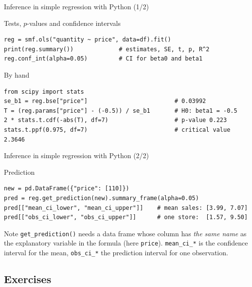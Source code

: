 \documentclass[aspectratio=169,11pt]{beamer}
\begin{document}
\begin{frame}[fragile]{Inference in simple regression with Python (1/2)}
  \begin{block}{Tests, $p$-values and confidence intervals}
\begin{lstlisting}
reg = smf.ols("quantity ~ price", data=df).fit()
print(reg.summary())             # estimates, SE, t, p, R^2
reg.conf_int(alpha=0.05)         # CI for beta0 and beta1
\end{lstlisting}
  \end{block}
  \begin{block}{By hand}
\begin{lstlisting}
from scipy import stats
se_b1 = reg.bse["price"]                         # 0.03992
T = (reg.params["price"] - (-0.5)) / se_b1       # H0: beta1 = -0.5
2 * stats.t.cdf(-abs(T), df=7)                   # p-value 0.223
stats.t.ppf(0.975, df=7)                         # critical value 2.3646
\end{lstlisting}
  \end{block}
\end{frame}

\begin{frame}[fragile]{Inference in simple regression with Python (2/2)}
  \begin{block}{Prediction}
\begin{lstlisting}
new = pd.DataFrame({"price": [110]})
pred = reg.get_prediction(new).summary_frame(alpha=0.05)
pred[["mean_ci_lower", "mean_ci_upper"]]    # mean sales: [3.99, 7.07]
pred[["obs_ci_lower", "obs_ci_upper"]]      # one store:  [1.57, 9.50]
\end{lstlisting}
  \end{block}
  \begin{exampleblock}{Note}
    \texttt{get\_prediction()} needs a data frame whose column has \emph{the
    same name} as the explanatory variable in the formula (here
    \texttt{price}). \texttt{mean\_ci\_*} is the confidence interval for the
    mean, \texttt{obs\_ci\_*} the prediction interval for one observation.
  \end{exampleblock}
\end{frame}

\subsection{Exercises}
\end{document}
